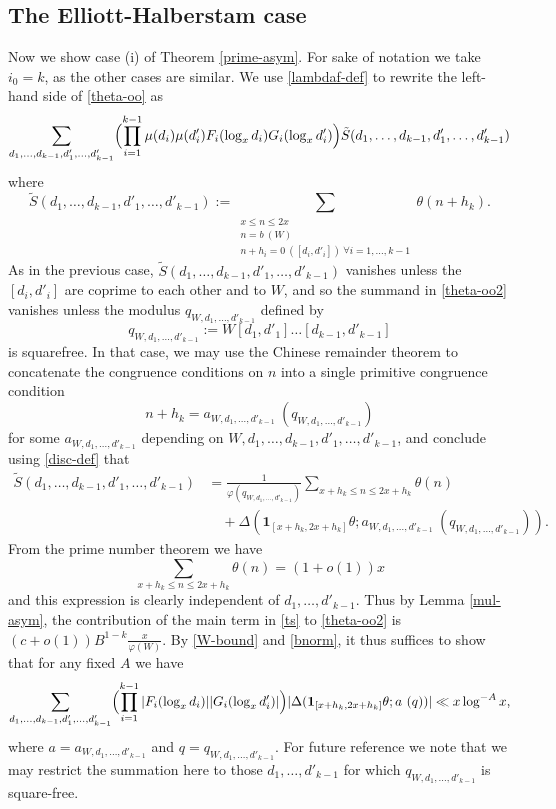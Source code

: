 \documentclass{bmcart}
\theoremstyle{plain}
\theoremstyle{definition}
\renewcommand{\phi}{\varphi}
\newcommand{\onef}{\mathbf{1}}
\begin{document}
\subsection{The Elliott-Halberstam case}\label{eh-case}

Now we show case (i) of Theorem \ref{prime-asym}.  For sake of notation we take $i_0=k$, as the other cases are similar.  We use \eqref{lambdaf-def} to rewrite the left-hand side of \eqref{theta-oo} as
\begin{equation}\label{theta-oo2}
 \sum_{d_1,\dots,d_{k-1},d'_1,\dots,d'_{k-1}} \Bigl(\prod_{i=1}^{k-1} \mu(d_i) \mu(d'_i) F_i(\log_x d_i) G_i(\log_x d'_i)\Bigr) \tilde S(d_1,\dots,d_{k-1},d'_1,\dots,d'_{k-1})
\end{equation}
where
$$ \tilde S(d_1,\dots,d_{k-1},d'_1,\dots,d'_{k-1}) := 
 \sum_{\substack{x \leq n \leq 2x\\ n = b\ (W) \\ n + h_i = 0\ ([d_i,d'_i])\ \forall i=1,\dots,k-1}} \theta(n+h_k).
$$
As in the previous case, $\tilde S(d_1,\dots,d_{k-1},d'_1,\dots,d'_{k-1})$ vanishes unless the $[d_i,d'_i]$ are coprime to each other and to $W$, and so the summand in \eqref{theta-oo2} vanishes unless the modulus $q_{W,d_1,\dots,d'_{k-1}}$ defined by
\begin{equation}\label{q-def}
q_{W,d_1,\dots,d'_{k-1}} := W [d_1,d'_1] \dots [d_{k-1},d'_{k-1}]
\end{equation}
is squarefree.  In that case, we may use the Chinese remainder theorem to concatenate the congruence conditions  on $n$ into a single primitive congruence condition  
$$n+h_k = a_{W,d_1,\dots,d'_{k-1}} \ (q_{W,d_1,\dots,d'_{k-1}})$$
for some $a_{W,d_1,\dots,d'_{k-1}}$ depending on $W, d_1,\dots,d_{k-1},d'_1,\dots,d'_{k-1}$, and conclude using \eqref{disc-def} that
\begin{equation}\label{ts}
\begin{split}
 \tilde S(d_1,\dots,d_{k-1},d'_1,\dots,d'_{k-1}) &= \frac{1}{\phi(q_{W,d_1,\dots,d'_{k-1}})} \sum_{x+h_k \leq n \leq 2x+h_k} \theta(n)\\
&\quad + \Delta( \onef_{[x+h_k,2x+h_k]} \theta;  a_{W,d_1,\dots,d'_{k-1}}\ (q_{W,d_1,\dots,d'_{k-1}})).
\end{split}
\end{equation}
From the prime number theorem we have
$$ \sum_{x+h_k \leq n \leq 2x+h_k} \theta(n) = (1+o(1)) x$$
and this expression is clearly independent of $d_1,\dots,d'_{k-1}$.  Thus by Lemma \ref{mul-asym}, the contribution of the main term in \eqref{ts} to \eqref{theta-oo2} is $(c+o(1)) B^{1-k} \frac{x}{\phi(W)}$.  By \eqref{W-bound} and \eqref{bnorm}, it thus suffices to show that for any fixed $A$ we have
\begin{equation}\label{sosmall}
 \sum_{d_1,\dots,d_{k-1},d'_1,\dots,d'_{k-1}} \Bigl(\prod_{i=1}^{k-1} |F_i(\log_x d_i)| |G_i(\log_x d'_i)|\Bigr) 
|\Delta( \onef_{[x+h_k,2x+h_k]} \theta;  a\ (q))| \ll x \log^{-A} x,
\end{equation}
where $a=a_{W,d_1,\dots,d'_{k-1}}$ and $q=q_{W,d_1,\dots,d'_{k-1}}$.  For future reference we note that we may restrict the summation here to those $d_1,\dots,d'_{k-1}$ for which $q_{W,d_1,\dots,d'_{k-1}}$ is square-free.
\end{document}
